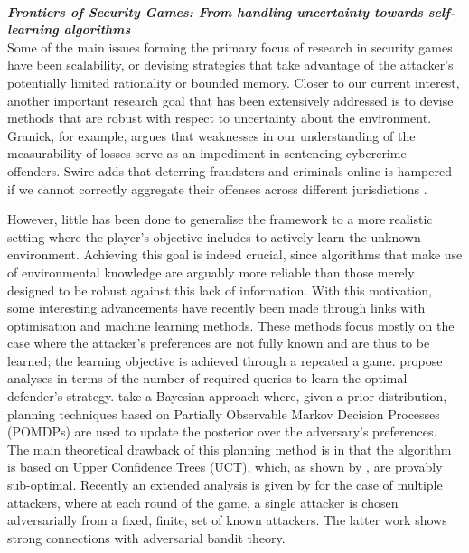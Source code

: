 \noindent \textbf{\textit{\\Frontiers of Security Games: From handling uncertainty towards self-learning algorithms}}\\
Some of the main issues forming the primary focus of research in security games have been scalability, or devising strategies that take advantage of the attacker's potentially limited rationality or bounded memory\cite{tambe2012game}. Closer to our current interest, another important research goal that has been extensively addressed is to devise methods that are robust with respect to uncertainty about the environment\cite{aghassi2006robust,Nguyen14RO, Kiekintveld:2013}.
Granick, for example,
argues that weaknesses in our understanding of the measurability of losses serve as
an impediment in sentencing cybercrime offenders\cite{granick2005faking}. Swire adds that deterring
fraudsters and criminals online is hampered if we cannot correctly aggregate their
offenses across different jurisdictions \cite{swire2009no}.


However, little has been done to generalise the framework to a more realistic setting where the player's objective includes to actively learn the unknown environment. Achieving this goal is indeed crucial, since algorithms that make use of environmental knowledge are arguably more reliable than those merely designed to be robust against this lack of information. With this motivation, some interesting advancements have recently been made through links with optimisation and machine learning methods. 
These methods focus mostly on the case where the attacker's preferences are not fully known and are thus to be learned; the learning objective is achieved through a repeated a game.  \cite{blum2014learning, letchford2009learning} propose analyses in terms of the number of required queries to learn the optimal defender's strategy. 
\cite{Marecki12PR, qian2014online} take a Bayesian approach where, given a prior distribution, planning techniques based on Partially Observable Markov Decision Processes (POMDPs) are used to update the posterior over the adversary's preferences.
The main theoretical drawback of this planning method is in that the algorithm is based on Upper Confidence Trees (UCT), which, as shown by  \cite{munos2014bandits}, are provably sub-optimal. 
Recently an extended analysis is given by \cite{Balcan15CR}  for the case of multiple attackers, where at each round of the game, a single attacker is chosen adversarially from a fixed, finite, set of known attackers. The latter work shows strong connections with adversarial bandit theory. 

